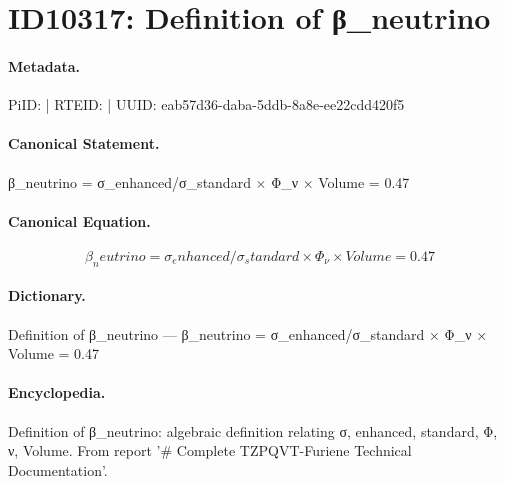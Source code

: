 \section*{ID10317: Definition of β\_neutrino}
\paragraph{Metadata.}
PiID:  | RTEID:  | UUID: eab57d36-daba-5ddb-8a8e-ee22cdd420f5

\paragraph{Canonical Statement.}
β\_neutrino = σ\_enhanced/σ\_standard × Φ\_ν × Volume = 0.47

\paragraph{Canonical Equation.}
\[
β_neutrino = σ_enhanced/σ_standard × Φ_ν × Volume = 0.47
\]

\paragraph{Dictionary.}
Definition of β\_neutrino — β\_neutrino = σ\_enhanced/σ\_standard × Φ\_ν × Volume = 0.47

\paragraph{Encyclopedia.}
Definition of β\_neutrino: algebraic definition relating σ, enhanced, standard, Φ, ν, Volume. From report '\# Complete TZPQVT-Furiene Technical Documentation'.
